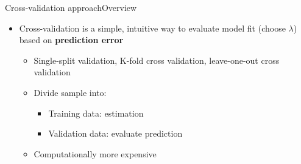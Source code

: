 \documentclass[dvipsnames,hyperref={pdfpagelabels=false}]{beamer}
\begin{document}





\date
{}


\begin{frame}{}
	\titlepage
\end{frame}





\begin{frame}{Cross-validation approach}{Overview}
	\begin{itemize}
		\item Cross-validation is a simple, intuitive way to evaluate model fit (choose $\lambda$) based on \textbf{prediction
		error}
					\vspace{0.2cm}
			\begin{itemize}
				\item Single-split validation, K-fold cross validation, leave-one-out cross validation
				\vspace{0.2cm}
				\item Divide sample into:
								\vspace{0.2cm}
				 			\begin{itemize}
				\item Training data: estimation
								\vspace{0.2cm}
				\item Validation data: evaluate prediction
								\vspace{0.2cm}
							\end{itemize}		
				\item Computationally more expensive 
			\end{itemize}		
					
	
		
	\end{itemize}
\end{frame}
\end{document}
